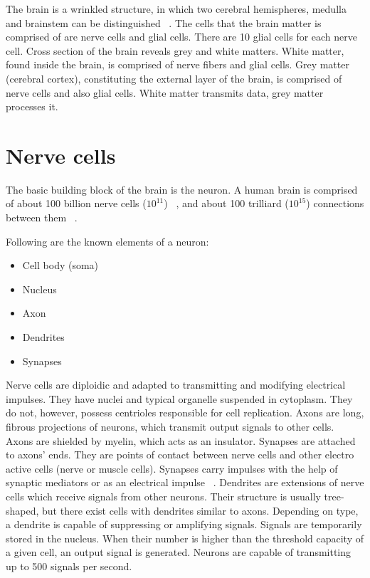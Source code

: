 \documentclass[10pt,oneside]{memoir}
\begin{document}
The brain is a wrinkled structure, in which two cerebral hemispheres, medulla and brainstem can be distinguished ~\cite{Jura:Krzanowska:1992}. The cells that the brain matter is comprised of are nerve cells and glial cells. There are 10 glial cells for each nerve cell.
Cross section of the brain reveals grey and white matters. White matter, found inside the brain, is comprised of nerve fibers and glial cells. Grey matter (cerebral cortex), constituting the external layer of the brain, is comprised of nerve cells and also glial cells. White matter transmits data, grey matter processes it.


\section{Nerve cells}
\label{nervecells}

The basic building block of the brain is the neuron. A human brain is comprised of about 100 billion nerve cells ($ {10}^{11}$) ~\cite{Greenfield:1999}, and about 100 trilliard ($ {10}^{15}$) connections between them ~\cite{Veggeberg:1996}.


Following are the known elements of a neuron:


\begin{itemize}


\item Cell body (soma)

\item Nucleus

\item Axon

\item Dendrites

\item Synapses
\end{itemize}

Nerve cells are diploidic and adapted to transmitting and modifying electrical impulses. They have nuclei and typical organelle suspended in cytoplasm. They do not, however, possess centrioles responsible for cell replication. Axons are long, fibrous projections of neurons, which transmit output signals to other cells. Axons are shielded by myelin, which acts as an insulator. Synapses are attached to axons' ends. They are points of contact between nerve cells and other electro active cells (nerve or muscle cells). Synapses carry impulses with the help of synaptic mediators or as an electrical impulse ~\cite{Jura:Krzanowska:1992}.
Dendrites are extensions of nerve cells which receive signals from other neurons. Their structure is usually tree-shaped, but there exist cells with dendrites similar to axons. Depending on type, a dendrite is capable of suppressing or amplifying signals. Signals are temporarily stored in the nucleus. When their number is higher than the threshold capacity of a given cell, an output signal is generated. Neurons are capable of transmitting up to 500 signals per second.
\end{document}
